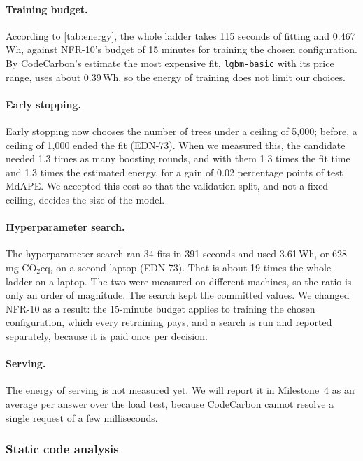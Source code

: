 \paragraph{Training budget.}
According to \cref{tab:energy}, the whole ladder takes 115 seconds of fitting and 0.467\,Wh, against NFR-10's budget of 15 minutes for training the chosen configuration.
By CodeCarbon's estimate the most expensive fit, \texttt{lgbm-basic} with its price range, uses about 0.39\,Wh, so the energy of training does not limit our choices.

\paragraph{Early stopping.}
Early stopping now chooses the number of trees under a ceiling of 5,000; before, a ceiling of 1,000 ended the fit (EDN-73).
When we measured this, the candidate needed 1.3 times as many boosting rounds, and with them 1.3 times the fit time and 1.3 times the estimated energy, for a gain of 0.02 percentage points of test MdAPE.
We accepted this cost so that the validation split, and not a fixed ceiling, decides the size of the model.

\paragraph{Hyperparameter search.}
The hyperparameter search ran 34 fits in 391 seconds and used 3.61\,Wh, or 628\,mg CO$_2$eq, on a second laptop (EDN-73).
That is about 19 times the whole ladder on a laptop.
The two were measured on different machines, so the ratio is only an order of magnitude.
The search kept the committed values.
We changed NFR-10 as a result: the 15-minute budget applies to training the chosen configuration, which every retraining pays, and a search is run and reported separately, because it is paid once per decision.

\paragraph{Serving.}
The energy of serving is not measured yet.
We will report it in Milestone~4 as an average per answer over the load test, because CodeCarbon cannot resolve a single request of a few milliseconds.

\subsubsection{Static code analysis}
\label{sec:m3-static-analysis}


